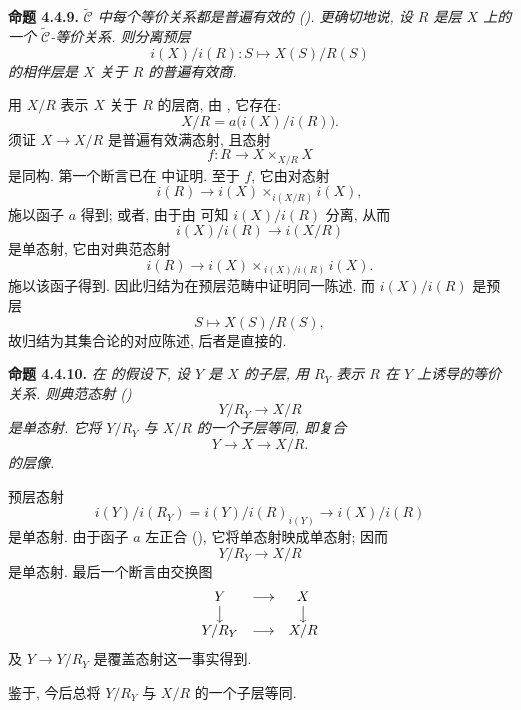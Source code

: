 
\setcounter{footnote}{38}

\medskip
\noindent{}\textbf{命题 4.4.9.}
\textit{\(\widetilde{\mathscr C}\) 中每个等价关系都是普遍有效的
(). 更确切地说,
设 \(R\) 是层 \(X\) 上的一个 \(\widetilde{\mathscr C}\)-等价关系.
则分离预层}
\[
  i(X)/i(R):S\longmapsto X(S)/R(S)
\]
\textit{的相伴层是 \(X\) 关于 \(R\) 的普遍有效商.}

用 \(X/R\) 表示 \(X\) 关于 \(R\) 的层商,
由 , 它存在:
\[
  X/R=a\bigl(i(X)/i(R)\bigr).
\]
须证 \(X\to X/R\) 是普遍有效满态射, 且态射
\[
  f:R\longrightarrow X\times_{X/R}X
\]
是同构. 第一个断言已在  中证明.
至于 \(f\), 它由对态射
\[
  i(R)\longrightarrow i(X)\times_{i(X/R)}i(X),
\]
施以函子 \(a\) 得到; 或者, 由于由
 可知 \(i(X)/i(R)\) 分离,
从而
\[
  i(X)/i(R)\longrightarrow i(X/R)
\]
是单态射, 它由对典范态射
\[
  i(R)\longrightarrow
  i(X)\times_{\,i(X)/i(R)}i(X).
\]
施以该函子得到. 因此归结为在预层范畴中证明同一陈述.
而 \(i(X)/i(R)\) 是预层
\[
  S\longmapsto X(S)/R(S),
\]
故归结为其集合论的对应陈述,
后者是直接的.

\medskip
\noindent{}\textbf{命题 4.4.10.}
\textit{在  的假设下,
设 \(Y\) 是 \(X\) 的子层, 用 \(R_Y\) 表示 \(R\)
在 \(Y\) 上诱导的等价关系. 则典范态射
()}
\[
  Y/R_Y\longrightarrow X/R
\]
\textit{是单态射. 它将 \(Y/R_Y\) 与 \(X/R\) 的一个子层等同,
即复合}
\[
  Y\longrightarrow X\longrightarrow X/R.
\]
\textit{的层像.}

预层态射
\[
  i(Y)/i(R_Y)
  =i(Y)/i(R)_{i(Y)}
  \longrightarrow i(X)/i(R)
\]
是单态射. 由于函子 \(a\) 左正合
(), 它将单态射映成单态射; 因而
\[
  Y/R_Y\longrightarrow X/R
\]
是单态射. 最后一个断言由交换图
\[
\begin{array}{ccc}
  Y&\longrightarrow&X\\
  \big\downarrow&&\big\downarrow\\
  Y/R_Y&\longrightarrow&X/R
\end{array}
\]
及 \(Y\to Y/R_Y\) 是覆盖态射这一事实得到.

鉴于,
今后总将 \(Y/R_Y\) 与 \(X/R\) 的一个子层等同.

